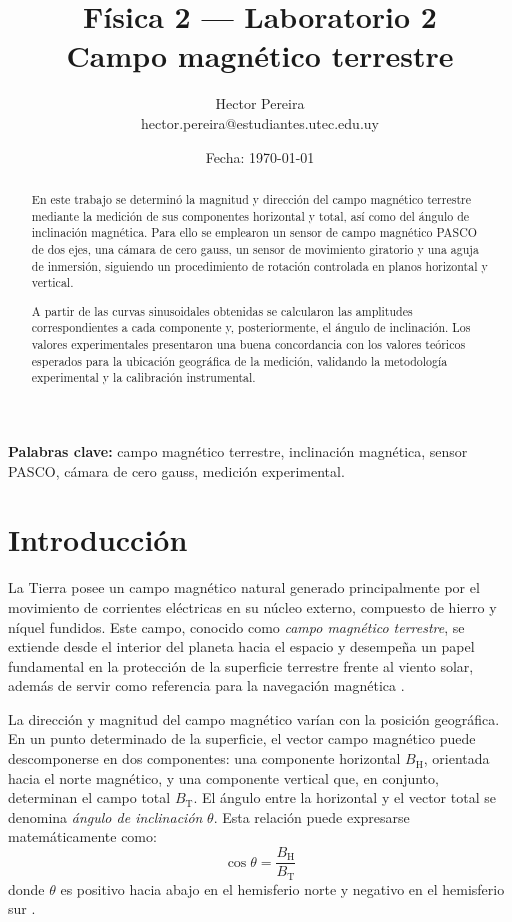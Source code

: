 \documentclass[12pt,a4paper]{article}
\title{\textbf{Física 2 --- Laboratorio 2}\\[0.2cm]
\large Campo magnético terrestre}
\author{
Hector Pereira \\ hector.pereira@estudiantes.utec.edu.uy
}
\date{Fecha: \today}
\begin{document}
\maketitle
\thispagestyle{empty}
\vspace{1cm}
\begin{abstract}
En este trabajo se determinó la magnitud y dirección del campo magnético terrestre mediante la medición de sus componentes horizontal y total, así como del ángulo de inclinación magnética. Para ello se emplearon un sensor de campo magnético PASCO de dos ejes, una cámara de cero gauss, un sensor de movimiento giratorio y una aguja de inmersión, siguiendo un procedimiento de rotación controlada en planos horizontal y vertical. 

A partir de las curvas sinusoidales obtenidas se calcularon las amplitudes correspondientes a cada componente y, posteriormente, el ángulo de inclinación. Los valores experimentales presentaron una buena concordancia con los valores teóricos esperados para la ubicación geográfica de la medición, validando la metodología experimental y la calibración instrumental.
\end{abstract}

\vspace{1cm}
\noindent\textbf{Palabras clave:} campo magnético terrestre, inclinación magnética, sensor PASCO, cámara de cero gauss, medición experimental.


\newpage

\section{Introducción}

La Tierra posee un campo magnético natural generado principalmente por el movimiento de corrientes eléctricas en su núcleo externo, compuesto de hierro y níquel fundidos. Este campo, conocido como \textit{campo magnético terrestre}, se extiende desde el interior del planeta hacia el espacio y desempeña un papel fundamental en la protección de la superficie terrestre frente al viento solar, además de servir como referencia para la navegación magnética \cite{serway}.

La dirección y magnitud del campo magnético varían con la posición geográfica. En un punto determinado de la superficie, el vector campo magnético puede descomponerse en dos componentes: una componente horizontal \( B_\mathrm{H} \), orientada hacia el norte magnético, y una componente vertical que, en conjunto, determinan el campo total \( B_\mathrm{T} \). El ángulo entre la horizontal y el vector total se denomina \textit{ángulo de inclinación} \( \theta \). Esta relación puede expresarse matemáticamente como:
\begin{equation}\label{eq:inclinacion}
\cos \theta = \frac{B_\mathrm{H}}{B_\mathrm{T}}
\end{equation}
donde \( \theta \) es positivo hacia abajo en el hemisferio norte y negativo en el hemisferio sur \cite{hyperphysics}.
\end{document}

